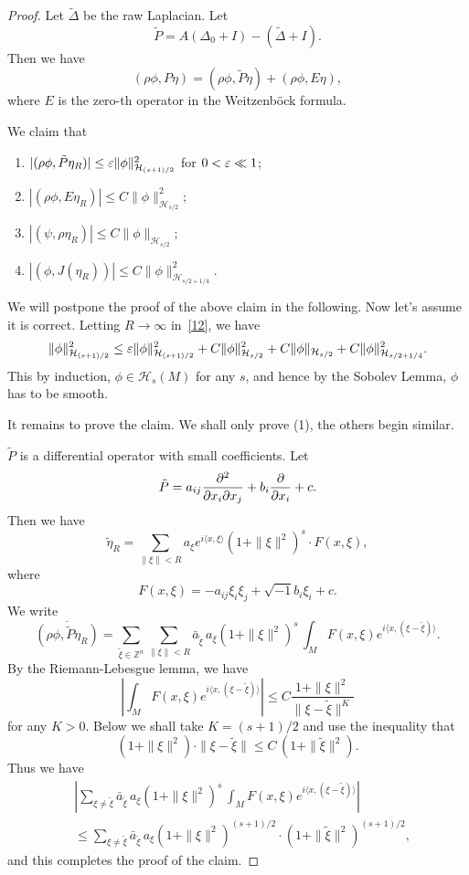 \begin{proof}
Let $\tilde\Delta$ be the raw Laplacian. Let
\[
\tilde P=A(\Delta_0+I)-(\tilde\Delta+I).
\]
Then we have
\[
(\rho\phi, P\eta)=(\rho\phi,\tilde P\eta)+(\rho\phi, E\eta),
\]
where $E$ is the zero-th operator in the Weitzenb\"ock formula. 

We claim that
\begin{enumerate}
\item $|(\rho\phi, \tilde P\eta_R)|\leq\varepsilon\|\phi\|^2_{\mathcal H_{(s+1)/2}}$ for $0<\varepsilon\ll1$;
\item $|(\rho\phi, E\eta_R)|\leq C\|\phi\|^2_{\mathcal H_{s/2}}$;
\item $|(\psi, \rho\eta_R)|\leq C \|\phi\|_{\mathcal H_{s/2}}$;
\item $|(\phi, J(\eta_R))|\leq C\|\phi\|^2_{\mathcal H_{s/2+1/4}}$.
\end{enumerate}

We will postpone the proof of the above claim in the following. Now let's assume it is correct. 
Letting $R\to\infty$ in~\eqref{12}, we have
\[
\|\phi\|^2_{\mathcal H_{(s+1)/2}}\leq \varepsilon \|\phi\|^2_{\mathcal H_{(s+1)/2}}+C\|\phi\|^2_{\mathcal H_{s/2}}+C\|\phi\|_{\mathcal H_{s/2}}+C\|\phi\|^2_{\mathcal H_{s/2+1/4}}.
\]
This by induction, $\phi\in \mathcal H_s(M)$ for any $s$, and hence by the Sobolev Lemma, $\phi$ has to be smooth.

It remains to prove the claim. We shall only prove (1), the others begin similar.

$\tilde P$ is a differential operator with small coefficients. Let
\[
\tilde P=a_{ij}\frac{\partial^2}{\partial x_i\partial x_j}+b_i\frac{\partial}{\partial x_i}+c.
\]
Then we have
\[
\tilde \eta_R=\sum_{\|\xi\|<R}a_\xi e^{i\langle x,\xi\rangle}(1+\|\xi\|^2)^s\cdot F(x,\xi),
\]
where
\[
F(x,\xi)=-a_{ij}\xi_i\xi_j+\sqrt{-1}b_i\xi_i+c.
\]
We write
\[
\overline{(\rho\phi,\tilde P\eta_R)}=\sum_{\tilde\xi\in\mathbb Z^n} \sum_{\|\xi\|<R}\bar a_{\tilde\xi} \,a_\xi (1+\|\xi\|^2)^s\, \int_M F(x,\xi) e^{i\langle x,(\xi-\tilde\xi)\rangle}.
\]
By the Riemann-Lebesgue lemma, we have
\[
\left|\int_M F(x,\xi) e^{i\langle x,(\xi-\tilde\xi)\rangle}\right|\leq C\frac{1+\|\xi\|^2}{\|\xi-\tilde\xi\|^K}
\]
for any $K>0$. Below we shall take $K=(s+1)/2$ and use the inequality that
\[
(1+\|\xi\|^2)\cdot\|\xi-\tilde\xi\|\leq C\,(1+\|\tilde\xi\|^2).
\]
Thus we have
\[
\begin{split}
&
\left|\sum_{\xi\neq\tilde\xi}\bar a_{\tilde\xi} \,a_\xi (1+\|\xi\|^2)^s\, \int_M F(x,\xi) e^{i\langle x,(\xi-\tilde\xi)\rangle}
\right|\\
&\leq\sum_{\xi\neq\tilde\xi}\bar a_{\tilde\xi} \,a_\xi (1+\|\xi\|^2)^{(s+1)/2}\cdot (1+\|\tilde\xi\|^2)^{(s+1)/2},
\end{split}
\]
and this completes the proof of the claim.
\end{proof}

